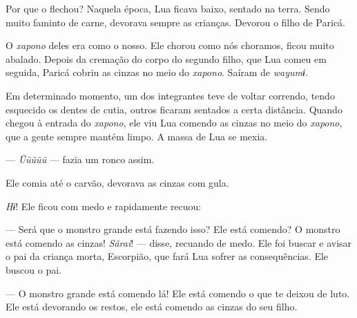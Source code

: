 Por que o flechou? Naquela época, Lua ficava baixo, sentado na
terra. Sendo muito faminto de carne, devorava sempre as crianças.
Devorou o filho de Paricá. 



O \textit{xapono} deles era como o nosso. Ele chorou como nós choramos, ficou
muito abalado. Depois da cremação do corpo do segundo filho, que Lua
comeu em seguida, Paricá cobriu as cinzas no meio do \textit{xapono}. Saíram
de \textit{wayumɨ}. 

Em determinado momento, um dos integrantes teve de voltar correndo,
tendo esquecido os dentes de cutia, outros ficaram sentados a certa
distância. Quando chegou à entrada do \textit{xapono}, ele viu Lua comendo as
cinzas no meio do \textit{xapono}, que a gente sempre mantém limpo. A massa de
Lua se mexia.

--- \textit{Ũũũũũ} --- fazia um ronco assim. 

Ele comia até o carvão, devorava as cinzas com gula. 

\textit{Hɨ}! Ele ficou com medo e rapidamente recuou: 

--- Será que o monstro grande está fazendo isso? Ele está comendo? O
monstro está comendo as cinzas! \textit{Sãrai}! --- disse, recuando de
medo. Ele foi buscar e avisar o pai da criança morta, Escorpião, que
fará Lua sofrer as consequências. Ele buscou o pai.

--- O monstro grande está comendo lá! Ele está comendo o que te deixou de
luto. Ele está devorando os restos, ele está comendo as cinzas
do seu filho. 

